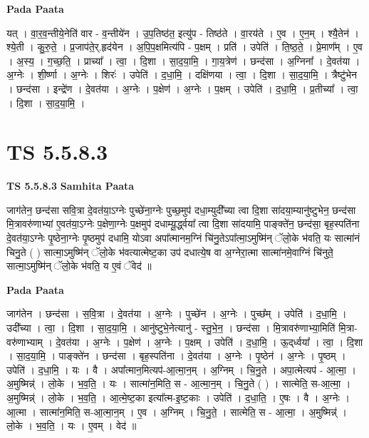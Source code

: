 \documentclass[17pt]{extarticle}
\begin{document}
\textbf{Pada Paata} \newline

यत् । वा॒र॒व॒न्तीये॒नेति॑ वार - व॒न्तीये॑न । उ॒प॒तिष्ठ॑त॒ इत्यु॑प - तिष्ठ॑ते । वा॒रय॑ते । ए॒व । ए॒न॒म् । श्यै॒तेन॑ । श्ये॒ती । कु॒रु॒ते॒ । प्र॒जाप॑ते॒र्.हृद॑येन । अ॒पि॒प॒क्षमित्य॑पि - प॒क्षम् । प्रति॑ । उपेति॑ । ति॒ष्ठ॒ते॒ । प्रे॒माण᳚म् । ए॒व । अ॒स्य॒ । ग॒च्छ॒ति॒ । प्राच्या᳚ । त्वा॒ । दि॒शा । सा॒द॒या॒मि॒ । गा॒य॒त्रेण॑ । छन्द॑सा । अ॒ग्निना᳚ । दे॒वत॑या । अ॒ग्नेः । शी॒र्ष्णा । अ॒ग्नेः । शिरः॑ । उपेति॑ । द॒धा॒मि॒ । दक्षि॑णया । त्वा॒ । दि॒शा । सा॒द॒या॒मि॒ । त्रैष्टु॑भेन । छन्द॑सा । इन्द्रे॑ण । दे॒वत॑या । अ॒ग्नेः । प॒क्षेण॑ । अ॒ग्नेः । प॒क्षम् । उपेति॑ । द॒धा॒मि॒ । प्र॒तीच्या᳚ । त्वा॒ । दि॒शा । सा॒द॒या॒मि॒ ।  \newline




\section*{ TS 5.5.8.3 }

\textbf{TS 5.5.8.3 } \newline
\textbf{Samhita Paata} \newline

जाग॑तेन॒ छन्द॑सा सवि॒त्रा दे॒वत॑या॒ऽग्नेः पुच्छे॑ना॒ग्नेः पुच्छ॒मुप॑ दधा॒म्युदी᳚च्या त्वा दि॒शा सा॑दया॒म्यानु॑ष्टुभेन॒ छन्द॑सा मि॒त्रावरु॑णाभ्यां ए॒वत॑या॒ऽग्नेः प॒क्षेणा॒ग्नेः प॒क्षमुप॑ दधाम्यू॒र्द्ध्वया᳚ त्वा दि॒शा सा॑दयामि॒ पाङ्क्ते॑न॒ छन्द॑सा॒ बृह॒स्पति॑ना दे॒वत॑या॒ऽग्नेः पृ॒ष्ठेना॒ग्नेः पृ॒ष्ठमुप॑ दधामि॒ योऽवा अपा᳚त्मानम॒ग्निं चि॑नु॒तेऽपा᳚त्मा॒ऽमुष्मि॑न् ॅलो॒के भ॑वति॒ यः सात्मा॑नं चिनु॒ते ( ) सात्मा॒ऽमुष्मि॑न् ॅलो॒के भ॑वत्यात्मेष्ट॒का उप॑ दधात्ये॒ष वा अ॒ग्नेरा॒त्मा सात्मा॑नमे॒वाग्निं चि॑नुते॒ सात्मा॒ऽमुष्मि॑न् ॅलो॒के भ॑वति॒ य ए॒वं ॅवेद॑ ॥ \newline

\textbf{Pada Paata} \newline

जाग॑तेन । छन्द॑सा । स॒वि॒त्रा । दे॒वत॑या । अ॒ग्नेः । पुच्छे॑न । अ॒ग्नेः । पुच्छ᳚म् । उपेति॑ । द॒धा॒मि॒ । उदी᳚च्या । त्वा॒ । दि॒शा । सा॒द॒या॒मि॒ । आनु॑ष्टुभे॒नेत्यानु॑ - स्तु॒भे॒न॒ । छन्द॑सा । मि॒त्रावरु॑णाभ्या॒मिति॑ मि॒त्रा-वरु॑णाभ्याम् । दे॒वत॑या । अ॒ग्नेः । प॒क्षेण॑ । अ॒ग्नेः । प॒क्षम् । उपेति॑ । द॒धा॒मि॒ । ऊ॒द्‌र्ध्वया᳚ । त्वा॒ । दि॒शा । सा॒द॒या॒मि॒ । पाङ्क्ते॑न । छन्द॑सा । बृह॒स्पति॑ना । दे॒वत॑या । अ॒ग्नेः । पृ॒ष्ठेन॑ । अ॒ग्नेः । पृ॒ष्ठम् । उपेति॑ । द॒धा॒मि॒ । यः । वै । अपा᳚त्मान॒मित्यप॑-आ॒त्मा॒न॒म् । अ॒ग्निम् । चि॒नु॒ते । अपा॒त्मेत्यप॑ - आ॒त्मा॒ । अ॒मुष्मिन्न्॑ । लो॒के । भ॒व॒ति॒ । यः । सात्मा॑न॒मिति॒ स - आ॒त्मा॒न॒म् । चि॒नु॒ते ( ) । सात्मेति॒ स-आ॒त्मा॒ । अ॒मुष्मिन्न्॑ । लो॒के । भ॒व॒ति॒ । आ॒त्मे॒ष्ट॒का इत्या᳚त्म-इ॒ष्ट॒काः । उपेति॑ । द॒धा॒ति॒ । ए॒षः । वै । अ॒ग्नेः । आ॒त्मा । सात्मा॑न॒मिति॒ स-आ॒त्मा॒न॒म् । ए॒व । अ॒ग्निम् । चि॒नु॒ते॒ । सात्मेति॒ स - आ॒त्मा॒ । अ॒मुष्मिन्न्॑ । लो॒के । भ॒व॒ति॒ । यः । ए॒वम् । वेद॑ ॥  \newline
\end{document}
